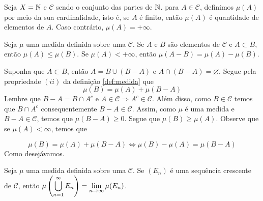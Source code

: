 \begin{example}
    Seja $X = \operatorname{\mathbb{N}}$ e $\mathcal{C}$ sendo o conjunto das partes de $\operatorname{\mathbb{N}}$. 
para $A \in \mathcal{C}$, definimos $\mu(A)$ por meio da sua cardinalidade, isto é, se $A$ é finito, então $\mu(A)$ é quantidade de elementos de $A$. Caso contrário, $\mu(A) = +\infty$.

\end{example}





\begin{theorem}
\label{teo:medida-diferença}
	Seja $\mu$ uma medida definida sobre uma \sigal $\mathcal{C}$.
	Se $A$ e $B$ são elementos de $\mathcal{C}$ e $A \subset B$, então $\mu(A) \leq \mu(B)$.
	Se $\mu(A) < +\infty$, então $\mu(A-B) = \mu(A) - \mu(B)$.
\end{theorem}

\begin{prova}
	Suponha que $A \subset B$, então $A = B \cup (B - A)$ e $A \cap (B - A) = \varnothing$. Segue pela propriedade $(ii)$ da definição \ref{def:medida} que 
	$$\mu(B) = \mu(A) + \mu(B-A)$$
	Lembre que $B-A = B\cap A^c$ e $A \in \mathcal{C} \Rightarrow A^c \in \mathcal{C}$.
	Além disso, como $B \in \mathcal{C}$ temos que $ B\cap A^c$ consequentemente $B - A \in \mathcal{C}$.
	Assim, como $\mu$ é uma medida e $B-A \in \mathcal{C}$, temos que $\mu(B-A) \geq 0$.
	Segue que $\mu(B) \geq \mu(A)$.
	Observe que se $\mu(A) < \infty$, temos que 

	$$\mu(B) = \mu(A) + \mu(B-A) 
 \Leftrightarrow \mu(B) - \mu(A) =  \mu(B-A)
 $$
Como desejávamos.
\end{prova}

\begin{proposition}
\label{prop:limite-sequencia-crescente}
Seja $\mu$ uma medida definida sobre uma \sigal $\mathcal{C}$.
Se $(E_n)$ é uma sequência crescente de $\mathcal{C}$, então $\mu\left(\displaystyle \bigcup_{n = 1}^\infty E_n\right) = \displaystyle \lim_{n \to \infty} \mu(E_n)$.
\end{proposition} 

